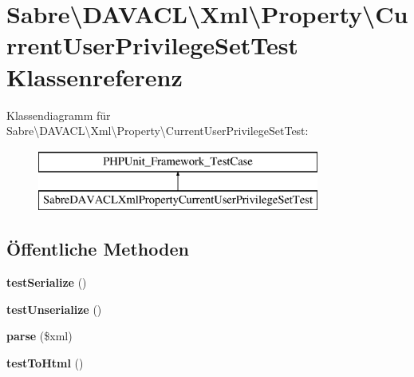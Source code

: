 \hypertarget{class_sabre_1_1_d_a_v_a_c_l_1_1_xml_1_1_property_1_1_current_user_privilege_set_test}{}\section{Sabre\textbackslash{}D\+A\+V\+A\+CL\textbackslash{}Xml\textbackslash{}Property\textbackslash{}Current\+User\+Privilege\+Set\+Test Klassenreferenz}
\label{class_sabre_1_1_d_a_v_a_c_l_1_1_xml_1_1_property_1_1_current_user_privilege_set_test}
Klassendiagramm für Sabre\textbackslash{}D\+A\+V\+A\+CL\textbackslash{}Xml\textbackslash{}Property\textbackslash{}Current\+User\+Privilege\+Set\+Test\+:\begin{figure}[H]
\begin{center}
\leavevmode
\includegraphics[height=2.000000cm]{class_sabre_1_1_d_a_v_a_c_l_1_1_xml_1_1_property_1_1_current_user_privilege_set_test}
\end{center}
\end{figure}
\subsection*{Öffentliche Methoden}
\begin{DoxyCompactItemize}
\item 
\mbox{\label{class_sabre_1_1_d_a_v_a_c_l_1_1_xml_1_1_property_1_1_current_user_privilege_set_test_ac6c25da1a1bcaddf8012964c1738026c}} 
{\bfseries test\+Serialize} ()
\item 
\mbox{\label{class_sabre_1_1_d_a_v_a_c_l_1_1_xml_1_1_property_1_1_current_user_privilege_set_test_abdf743b6572a07d5500a0e397bd02ad0}} 
{\bfseries test\+Unserialize} ()
\item 
\mbox{\label{class_sabre_1_1_d_a_v_a_c_l_1_1_xml_1_1_property_1_1_current_user_privilege_set_test_a01182a4588b243a96606d862011eabe8}} 
{\bfseries parse} (\$xml)
\item 
\mbox{\label{class_sabre_1_1_d_a_v_a_c_l_1_1_xml_1_1_property_1_1_current_user_privilege_set_test_afb96d841530e543abbfd4a740d73d376}} 
{\bfseries test\+To\+Html} ()
\end{DoxyCompactItemize}


